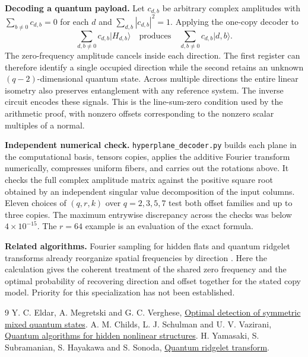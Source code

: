 \documentclass[11pt]{article}
\newcommand{\ket}[1]{\lvert #1\rangle}
\newcommand{\file}[1]{{\small\nolinkurl{#1}}}
\begin{document}
\textbf{Decoding a quantum payload.} Let $c_{d,b}$ be arbitrary complex
amplitudes with $\sum_{b\ne0}c_{d,b}=0$ for each $d$ and
$\sum_{d,b}|c_{d,b}|^2=1$. Applying the one-copy decoder to
\[
     \sum_{d,b\ne0}c_{d,b}\ket{H_{d,b}}
     \quad\text{produces}\quad
     \sum_{d,b\ne0}c_{d,b}\ket{d,b}.
\]
The zero-frequency amplitude cancels inside each direction. The first
register can therefore identify a single occupied direction while the
second retains an unknown $(q-2)$-dimensional quantum state. Across
multiple directions the entire linear isometry also preserves entanglement
with any reference system. The inverse circuit encodes these signals.
This is the line-sum-zero condition used by the arithmetic proof, with
nonzero offsets corresponding to the nonzero scalar multiples of a normal.

\textbf{Independent numerical check.} \file{hyperplane_decoder.py} builds
each plane in the computational basis, tensors copies, applies the additive
Fourier transform numerically, compresses uniform fibers, and carries out
the rotations above. It checks the full complex amplitude matrix against
the positive square root obtained by an independent singular value
decomposition of the input columns. Eleven choices of $(q,r,k)$ over
$q=2,3,5,7$ test both offset families and up to three copies. The maximum
entrywise discrepancy across the checks was below $4\times10^{-15}$.
The $r=64$ example is an evaluation of the exact formula.

\textbf{Related algorithms.} Fourier sampling for hidden flats and
quantum ridgelet transforms already reorganize spatial frequencies by
direction \cite{childs,ridge}. Here the calculation gives the coherent
treatment of the shared zero frequency and the optimal probability of
recovering direction and offset together for the stated copy model.
Priority for this specialization has not been established.

\small
\begin{thebibliography}{9}
\setlength{\itemsep}{0pt}\setlength{\parskip}{0pt}
 Y. C. Eldar, A. Megretski and G. C. Verghese,
\href{https://arxiv.org/abs/quant-ph/0211111}{Optimal detection of symmetric mixed quantum states}.
 A. M. Childs, L. J. Schulman and U. V. Vazirani,
\href{https://users.cms.caltech.edu/~schulman/Papers/quantum-nonlinear.pdf}{Quantum algorithms for hidden nonlinear structures}.
 H. Yamasaki, S. Subramanian, S. Hayakawa and S. Sonoda,
\href{https://arxiv.org/abs/2301.11936}{Quantum ridgelet transform}.
\end{thebibliography}
\end{document}
